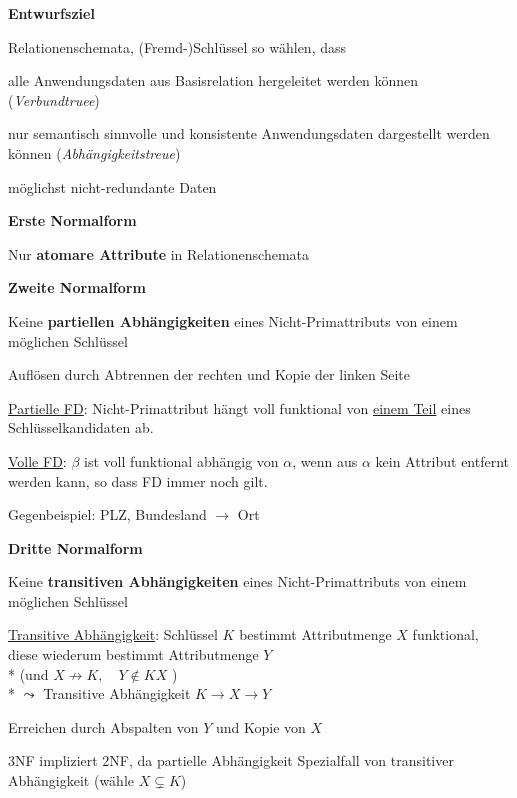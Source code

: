\newpage

\textbf{Entwurfsziel}
\begin{items}
	\item Relationenschemata, (Fremd-)Schlüssel so wählen, dass
	\begin{enumeration}
		\item alle Anwendungsdaten aus Basisrelation hergeleitet werden können (\emph{Verbundtruee})
		\item nur semantisch sinnvolle und konsistente Anwendungsdaten dargestellt werden können (\emph{Abhängigkeitstreue})
		\item möglichst nicht-redundante Daten
	\end{enumeration}
\end{items}

\textbf{Erste Normalform}
\begin{items}
	\item Nur \textbf{atomare Attribute} in Relationenschemata
\end{items}

\textbf{Zweite Normalform}
\begin{items}
	\item Keine \textbf{partiellen Abhängigkeiten} eines Nicht-Primattributs von einem möglichen Schlüssel
	\item Auflösen durch Abtrennen der rechten und Kopie der linken Seite
	\item \underline{Partielle FD}: Nicht-Primattribut hängt voll funktional von \underline{einem Teil} eines Schlüsselkandidaten ab.
	\item \underline{Volle FD}: \( \beta \) ist voll funktional abhängig von \( \alpha \), wenn aus \( \alpha \) kein Attribut entfernt werden kann, so dass FD immer noch gilt.
	\item Gegenbeispiel: PLZ, Bundesland \( \to \) Ort
\end{items}

\textbf{Dritte Normalform}
\begin{items}
	\item Keine \textbf{transitiven Abhängigkeiten} eines Nicht-Primattributs von einem möglichen Schlüssel
	\item \underline{Transitive Abhängigkeit}: Schlüssel \( K \) bestimmt Attributmenge \( X \) funktional, diese wiederum bestimmt Attributmenge \( Y \) \\* 
	(und $X \nrightarrow K, \quad Y \notin KX$ ) \\*
	\( \leadsto \) Transitive Abhängigkeit \(K  \to X \to Y \)
	\item Erreichen durch Abspalten von \( Y \) und Kopie von \( X \)
	\item 3NF impliziert 2NF, da partielle Abhängigkeit Spezialfall von transitiver Abhängigkeit (wähle $X \subsetneq K$)
\end{items}

